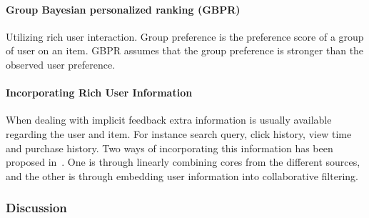 \paragraph{Group Bayesian personalized ranking (GBPR)~\cite{Pan:2013:GGP:2540128.2540516}}

Utilizing rich user interaction.  Group preference is the preference score of a
group of user on an item.  GBPR assumes that the group preference is stronger
than the observed user preference.

\paragraph{Incorporating Rich User Information~\cite{deLace2011,Li2013}}

When dealing with implicit feedback extra information is usually available
regarding the user and item.  For instance search query, click history, view
time and purchase history.  Two ways of incorporating this information has been
proposed in~\cite{deLace2011}.  One is through linearly combining cores from
the different sources, and the other is through embedding user information into
collaborative filtering.

\subsubsection{Discussion}
